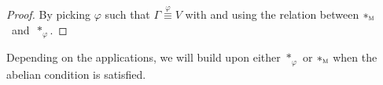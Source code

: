 \begin{proof} By picking $\varphi$ such that $\Gamma \overset{\varphi}{\equiv} V$ with  and using the relation between $\ast_{\operatorname{\textsc{m}}}$~and~$\ast_{\varphi}$.
\end{proof}

Depending on the applications, we will build upon either $\ast_{\varphi}$ or $\ast_{\operatorname{\textsc{m}}}$ when the abelian condition is satisfied.
